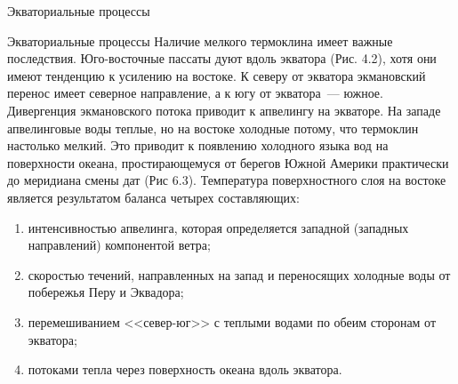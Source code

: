 \begin{chapter}{Экваториальные процессы}
\begin{section}{Экваториальные процессы}
Наличие мелкого термоклина имеет важные последствия. Юго-восточные
пассаты дуют вдоль экватора (Рис. 4.2), хотя они имеют тенденцию к
усилению на востоке. К северу от экватора экмановский перенос имеет
северное направление, а к югу от экватора~--- южное. Дивергенция
экмановского потока приводит к апвелингу на экваторе. На западе
апвелинговые воды теплые, но на востоке холодные потому, что термоклин
настолько мелкий. Это приводит к появлению холодного языка вод на
поверхности океана, простирающемуся от берегов Южной Америки
практически до меридиана смены дат (Рис 6.3). Температура
поверхностного слоя на востоке является результатом баланса четырех
составляющих:
%
%
\begin{enumerate}

\item
интенсивностью апвелинга, которая определяется западной (западных
направлений) компонентой ветра;
%

\item
скоростью течений, направленных на запад и переносящих холодные воды
от побережья Перу и Эквадора;
%

\item
перемешиванием <<север-юг>> с теплыми водами по обеим сторонам от
экватора;
%

\item
потоками тепла через поверхность океана вдоль экватора. 
%
\end{enumerate}


\end{section}
\end{chapter}
